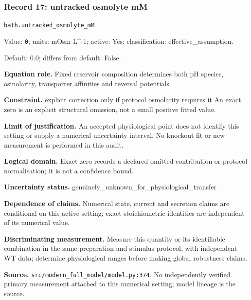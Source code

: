 \subsubsection*{Record 17: untracked osmolyte mM}
{\small \nolinkurl{bath.untracked_osmolyte_mM}\par

Value: \texttt{0}; units: mOsm L\textasciicircum{}-1; active: Yes; classification: effective\_assumption.\par

Default: 0.0; differs from default: False.\par

\textbf{Equation role.} Fixed reservoir composition determines bath pH species, osmolarity, transporter affinities and reversal potentials.\par

\textbf{Constraint.} explicit correction only if protocol osmolarity requires it An exact zero is an explicit structural omission, not a small positive fitted value.\par

\textbf{Limit of justification.} An accepted physiological point does not identify this setting or supply a numerical uncertainty interval. No knockout fit or new measurement is performed in this audit.\par

\textbf{Logical domain.} Exact zero records a declared omitted contribution or protocol normalisation; it is not a confidence bound.\par

\textbf{Uncertainty status.} genuinely\_unknown\_for\_physiological\_transfer\par

\textbf{Dependence of claims.} Numerical state, current and secretion claims are conditional on this active setting; exact stoichiometric identities are independent of its numerical value.\par

\textbf{Discriminating measurement.} Measure this quantity or its identifiable combination in the same preparation and stimulus protocol, with independent WT data; determine physiological ranges before making global robustness claims.\par

\textbf{Source.} \nolinkurl{src/modern_full_model/model.py:374}. No independently verified primary measurement attached to this numerical setting; model lineage is the source.\par}

